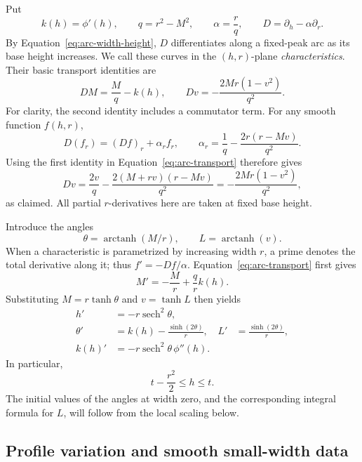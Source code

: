 

Put
\[
  k(h)=\phi'(h),\qquad q=r^2-M^2,\qquad
  \alpha=\frac rq,\qquad
  D=\partial_h-\alpha\partial_r.
\]
By Equation~\eqref{eq:arc-width-height}, \(D\) differentiates along a
fixed-peak arc as its base height increases. We call these curves in
the \((h,r)\)-plane \emph{characteristics}. Their basic transport
identities are
\begin{equation}\label{eq:arc-transport}
  DM=\frac Mq-k(h),\qquad
  Dv=-\frac{2Mr(1-v^2)}{q^2}.
\end{equation}
For clarity, the second identity includes a commutator term. For any
smooth function \(f(h,r)\),
\[
  D(f_r)=(Df)_r+\alpha_r f_r,\qquad
  \alpha_r=\frac1q-\frac{2r(r-Mv)}{q^2}.
\]
Using the first identity in Equation~\eqref{eq:arc-transport} therefore
gives
\[
  Dv=\frac{2v}{q}
       -\frac{2(M+rv)(r-Mv)}{q^2}
     =-\frac{2Mr(1-v^2)}{q^2},
\]
as claimed. All partial \(r\)-derivatives here are taken at fixed base
height.

Introduce the angles
\[
  \theta=\operatorname{arctanh}(M/r),\qquad
  L=\operatorname{arctanh}(v).
\]
When a characteristic is parametrized by increasing width \(r\), a
prime denotes the total derivative along it; thus \(f'=-Df/\alpha\).
Equation~\eqref{eq:arc-transport} first gives
\[
  M'=-\frac Mr+\frac qr k(h).
\]
Substituting \(M=r\tanh\theta\) and \(v=\tanh L\) then yields
\begin{equation}\label{eq:arc-characteristics}
\begin{aligned}
  h'&=-r\operatorname{sech}^2\theta,\\
  \theta'&=k(h)-\frac{\sinh(2\theta)}r,&
  L'&=\frac{\sinh(2\theta)}r,\\
  k(h)'&=-r\operatorname{sech}^2\theta\,\phi''(h).
\end{aligned}
\end{equation}
In particular,
\begin{equation}\label{eq:arc-height-bound}
  t-\frac{r^2}{2}\le h\le t.
\end{equation}
The initial values of the angles at width zero, and the corresponding
integral formula for \(L\), will follow from the local scaling below.

\subsection{Profile variation and smooth small-width data}

